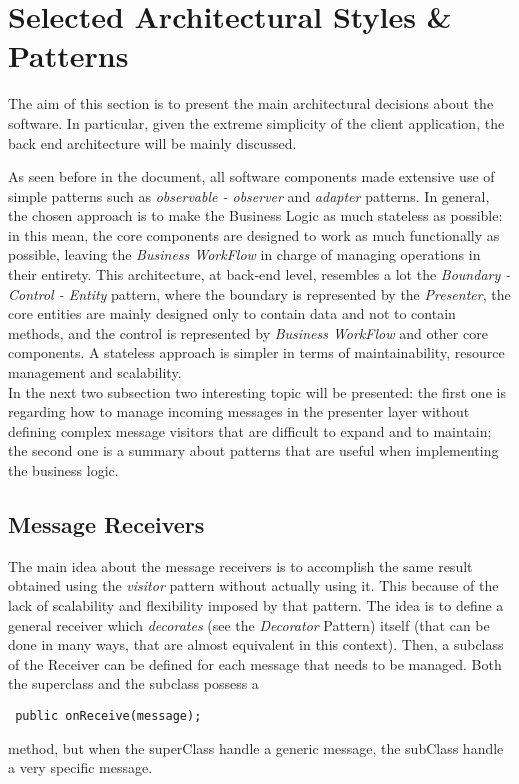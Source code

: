 \section{Selected Architectural Styles \& Patterns}
The aim of this section is to present the main architectural decisions about the software. In particular, given the extreme simplicity of the client application,
the back end architecture will be mainly discussed.

As seen before in the document, all software components made extensive use of simple patterns such as \emph{observable - observer} and \emph{adapter} patterns. In general, the chosen approach is to make the Business Logic as much stateless as possible: in this mean, the core components are designed to work as much functionally as possible, leaving the \emph{Business WorkFlow} in charge of managing operations in their entirety. This architecture, at back-end level, resembles a lot the \emph{Boundary - Control - Entity } pattern, where the boundary is represented by the \emph{Presenter}, the core entities are mainly designed only to contain data and not to contain methods, and the control is represented by \emph{Business WorkFlow} and other core components. A stateless approach is simpler in terms of maintainability, resource management and scalability.
\\
In the next two subsection two interesting topic will be presented: the first one is regarding how to manage incoming messages in the presenter layer without defining complex message visitors that are difficult to expand and to maintain; the second one is a summary about patterns that are useful when implementing the business logic. 

\subsection{Message Receivers}
The main idea about the message receivers is to accomplish the same result obtained using the \emph{visitor} pattern without actually using it. This because of the lack of scalability and flexibility imposed by that pattern. The idea is to define a general receiver which \emph{decorates} (see the \emph{Decorator} Pattern) itself (that can be done in many ways, that are almost equivalent in this context). Then, a subclass of the Receiver can be defined for each message that needs to be managed. Both the superclass and the subclass possess a \begin{verbatim} public onReceive(message);\end{verbatim} method, but when the superClass handle a generic message, the subClass handle a very specific message.

